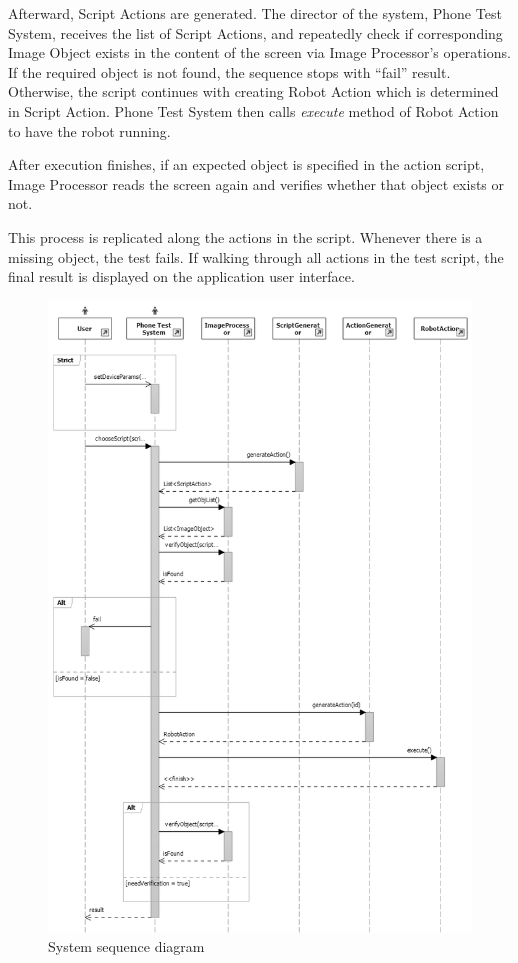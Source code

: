 Afterward, Script Actions are generated. The director of the system, Phone Test System, receives the list of Script Actions, and repeatedly check if corresponding Image Object exists in the content of the screen via Image Processor's operations. If the required object is not found, the sequence stops with ``fail'' result. Otherwise, the script continues with creating Robot Action which is determined in Script Action. Phone Test System then calls \textit{execute} method of Robot Action to have the robot running.

After execution finishes, if an expected object is specified in the action script, Image Processor reads the screen again and verifies whether that object exists or not.

This process is replicated along the actions in the script. Whenever there is a missing object, the test fails. If walking through all actions in the test script, the final result is displayed on the application user interface.

    \begin{figure}[H]
		\centering
		\includegraphics[scale=0.75]{Chapters/Fig/sequence_diagram.png}
		\caption{System sequence diagram}
		\label{fig:sequence_diagram}
	\end{figure}

